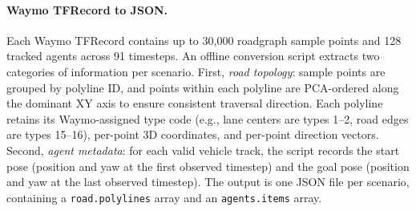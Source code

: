 \paragraph{Waymo TFRecord to JSON.}
Each Waymo TFRecord contains up to 30{,}000 roadgraph sample points and 128 tracked agents across 91 timesteps.
An offline conversion script extracts two categories of information per scenario.
First, \emph{road topology}: sample points are grouped by polyline ID, and points within each polyline are PCA-ordered along the dominant XY axis to ensure consistent traversal direction.
Each polyline retains its Waymo-assigned type code (e.g., lane centers are types 1--2, road edges are types 15--16), per-point 3D coordinates, and per-point direction vectors.
Second, \emph{agent metadata}: for each valid vehicle track, the script records the start pose (position and yaw at the first observed timestep) and the goal pose (position and yaw at the last observed timestep).
The output is one JSON file per scenario, containing a \texttt{road.polylines} array and an \texttt{agents.items} array.


